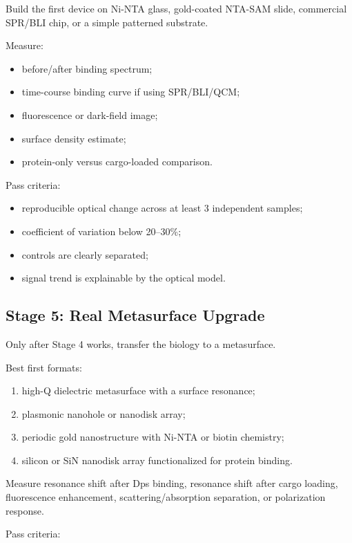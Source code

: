 \documentclass[11pt]{article}
\begin{document}
Build the first device on Ni-NTA glass, gold-coated NTA-SAM slide, commercial SPR/BLI chip, or a simple patterned substrate.

Measure:

\begin{itemize}
\item before/after binding spectrum;
\item time-course binding curve if using SPR/BLI/QCM;
\item fluorescence or dark-field image;
\item surface density estimate;
\item protein-only versus cargo-loaded comparison.
\end{itemize}

Pass criteria:

\begin{itemize}
\item reproducible optical change across at least 3 independent samples;
\item coefficient of variation below 20--30\%;
\item controls are clearly separated;
\item signal trend is explainable by the optical model.
\end{itemize}

\subsection{Stage 5: Real Metasurface Upgrade}

Only after Stage 4 works, transfer the biology to a metasurface.

Best first formats:

\begin{enumerate}
\item high-Q dielectric metasurface with a surface resonance;
\item plasmonic nanohole or nanodisk array;
\item periodic gold nanostructure with Ni-NTA or biotin chemistry;
\item silicon or SiN nanodisk array functionalized for protein binding.
\end{enumerate}

Measure resonance shift after Dps binding, resonance shift after cargo loading, fluorescence enhancement, scattering/absorption separation, or polarization response.

Pass criteria:
\end{document}
